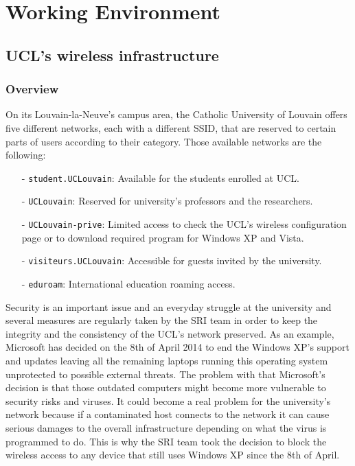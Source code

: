 
\chapter{Working Environment} %

\label{Chapter2} %



\section{UCL's wireless infrastructure}

\subsection{Overview}
On its Louvain-la-Neuve's campus area, the Catholic University of Louvain offers five different networks, each with a different SSID, that are reserved to certain parts of users according to their category. Those available networks are the following:
\begin{itemize}
	\item[-] \texttt{student.UCLouvain}: Available for the students enrolled at UCL.
	\item[-] \texttt{UCLouvain}: Reserved for university's professors and the researchers.
	\item[-] \texttt{UCLouvain-prive}: Limited access to check the UCL's wireless configuration page or to download required program for Windows XP and Vista.
	\item[-] \texttt{visiteurs.UCLouvain}: Accessible for guests invited by the university.
	\item[-] \texttt{eduroam}: International education roaming access.
\end{itemize}

Security is an important issue and an everyday struggle at the university and several measures are regularly taken by the SRI team in order to keep the integrity and the consistency of the UCL's network preserved. As an example, Microsoft has decided on the 8th of April 2014 to end the Windows XP's support and updates leaving all the remaining laptops running this operating system unprotected to possible external threats\cite{windows}. The problem with that Microsoft's decision is that those outdated computers might become more vulnerable to security risks and viruses. It could become a real problem for the university's network because if a contaminated host connects to the network it can cause serious damages to the overall infrastructure depending on what the virus is programmed to do. This is why the SRI team took the decision to block the wireless access to any device that still uses Windows XP since the 8th of April.

